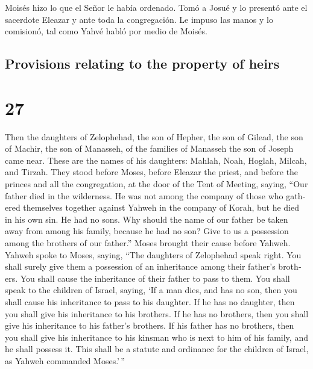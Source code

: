\begin{paracol}{2}
 Moisés hizo lo que el Señor le había ordenado. Tomó a
Josué y lo presentó ante el sacerdote Eleazar y ante toda la
congregación.  Le impuso las manos y lo comisionó, tal
como Yahvé habló por medio de Moisés.

\switchcolumn
\begin{otherlanguage}{english}

\hypertarget{provisions-relating-to-the-property-of-heirs}{%
\subsection{Provisions relating to the property of
heirs}\label{provisions-relating-to-the-property-of-heirs}}

\hypertarget{section-53}{%
\section{27}\label{section-53}}

 Then the daughters of Zelophehad, the son of Hepher, the
son of Gilead, the son of Machir, the son of Manasseh, of the families
of Manasseh the son of Joseph came near. These are the names of his
daughters: Mahlah, Noah, Hoglah, Milcah, and Tirzah.  They
stood before Moses, before Eleazar the priest, and before the princes
and all the congregation, at the door of the Tent of Meeting, saying,
 ``Our father died in the wilderness. He was not among the
company of those who gathered themselves together against Yahweh in the
company of Korah, but he died in his own sin. He had no sons.
 Why should the name of our father be taken away from
among his family, because he had no son? Give to us a possession among
the brothers of our father.''  Moses brought their cause
before Yahweh.  Yahweh spoke to Moses, saying,
 ``The daughters of Zelophehad speak right. You shall
surely give them a possession of an inheritance among their father's
brothers. You shall cause the inheritance of their father to pass to
them.  You shall speak to the children of Israel, saying,
`If a man dies, and has no son, then you shall cause his inheritance to
pass to his daughter.  If he has no daughter, then you
shall give his inheritance to his brothers.  If he has no
brothers, then you shall give his inheritance to his father's brothers.
 If his father has no brothers, then you shall give his
inheritance to his kinsman who is next to him of his family, and he
shall possess it. This shall be a statute and ordinance for the children
of Israel, as Yahweh commanded Moses.'\,''


\end{otherlanguage}
\end{paracol}
